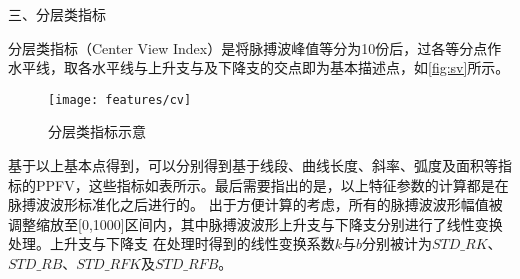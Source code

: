 三、分层类指标

分层类指标（Center View Index）是将脉搏波峰值等分为10份后，过各等分点作水平线，取各水平线与上升支与及下降支的交点即为基本描述点，如\autoref{fig:sv}所示。
\begin{figure}[htbp]
  \centering
  \texttt{[image: features/cv]}
  \caption{\label{fig:sv}分层类指标示意}
\end{figure}

基于以上基本点得到，可以分别得到基于线段、曲线长度、斜率、弧度及面积等指标的PPFV，这些指标如表所示。最后需要指出的是，以上特征参数的计算都是在脉搏波波形标准化之后进行的。
出于方便计算的考虑，所有的脉搏波波形幅值被调整缩放至[0,1000]区间内，其中脉搏波波形上升支与下降支分别进行了线性变换处理。上升支与下降支
在处理时得到的线性变换系数$k$与$b$分别被计为$STD\_RK$、$STD\_RB$、$STD\_RFK$及$STD\_RFB$。
